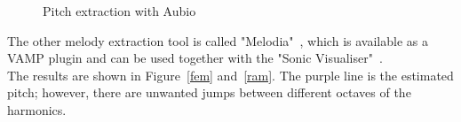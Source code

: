 \begin{figure}[htbp]
	\centering
	\caption{Pitch extraction with Aubio}
	\label{fig:aubio}
\end{figure}
\FloatBarrier
\noindent The other melody extraction tool is called "Melodia"~\cite{melodia1}, which is available as a VAMP plugin and can be used together with the "Sonic Visualiser"~\cite{sonviz1}.\\
The results are shown in Figure~\ref{fem} and~\ref{ram}.
The purple line is the estimated pitch; however, there are unwanted jumps between different octaves of the harmonics. 


